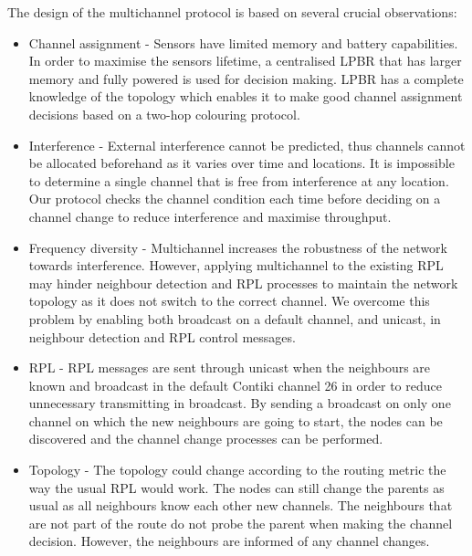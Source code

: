 The design of the multichannel protocol is based on several crucial observations:
\begin{itemize}
\item Channel assignment - Sensors have limited memory and battery capabilities. In order to maximise the sensors lifetime, a centralised LPBR that has larger memory and fully powered is used for decision making. LPBR has a complete knowledge of the topology which enables it to make good channel assignment decisions based on a two-hop colouring protocol.

\item Interference - External interference cannot be predicted, thus channels cannot be allocated beforehand as it varies over time and locations. It is impossible to determine a single channel that is free from interference at any location. Our protocol checks the channel condition each time before deciding on a channel change to reduce interference and maximise throughput.

\item Frequency diversity - Multichannel increases the robustness of the network towards interference. However, applying multichannel to the existing RPL may hinder neighbour detection and RPL processes to maintain the network topology as it does not switch to the correct channel. We overcome this problem by enabling both broadcast on a default channel, and unicast, in neighbour detection and RPL control messages. 

\item RPL - RPL messages are sent through unicast when the neighbours are known and broadcast in the default Contiki channel 26 in order to reduce unnecessary transmitting in broadcast. By sending a broadcast on only one channel on which the new neighbours are going to start, the nodes can be discovered and the channel change processes can be performed. 

\item Topology - The topology could change according to the routing metric the way the usual RPL would work.
The nodes can still change the parents as usual as all neighbours know each other new channels. The neighbours that are not part of the route do not probe the parent when making the channel decision. However, the neighbours are informed of any channel changes.

\end{itemize}

